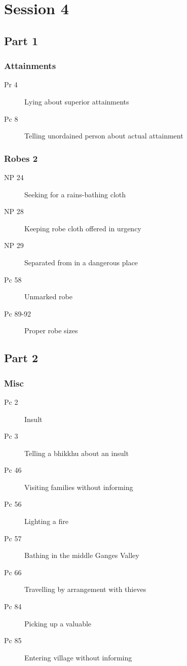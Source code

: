 \documentclass[11pt,oneside]{memoir}
\begin{document}
\chapter{Session 4}

\begin{multicols}{2}

\section{Part 1}

\subsection{Attainments}

\begin{description}
\item[Pr 4] Lying about superior attainments
\item[Pc 8] Telling unordained person about actual attainment
\end{description}

\subsection{Robes 2}

\begin{description}
\item[NP 24] Seeking for a rains-bathing cloth
\item[NP 28] Keeping robe cloth offered in urgency
\item[NP 29] Separated from in a dangerous place
\item[Pc 58] Unmarked robe
\item[Pc 89-92] Proper robe sizes
\end{description}

\columnbreak

\section{Part 2}

\subsection{Misc}

\begin{description}
\item[Pc 2] Insult
\item[Pc 3] Telling a bhikkhu about an insult
\item[Pc 46] Visiting families without informing
\item[Pc 56] Lighting a fire
\item[Pc 57] Bathing in the middle Ganges Valley
\item[Pc 66] Travelling by arrangement with thieves
\item[Pc 84] Picking up a valuable
\item[Pc 85] Entering village without informing
\end{description}

\end{multicols}
\end{document}
